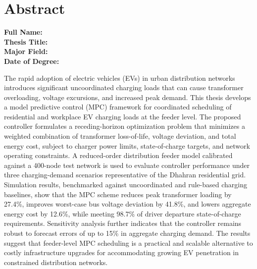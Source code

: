 \chapter*{Abstract}
\noindent
\textbf{Full Name:} \tauthor\\
\textbf{Thesis Title:} \ttitle\\
\textbf{Major Field:} \tmajor\\
\textbf{Date of Degree:} \tmonth\ \tyear

\vspace{0.5cm}
The rapid adoption of electric vehicles (EVs) in urban distribution networks introduces
significant uncoordinated charging loads that can cause transformer overloading, voltage
excursions, and increased peak demand. This thesis develops a model predictive control (MPC)
framework for coordinated scheduling of residential and workplace EV charging loads at the
feeder level. The proposed controller formulates a receding-horizon optimization problem that
minimizes a weighted combination of transformer loss-of-life, voltage deviation, and total
energy cost, subject to charger power limits, state-of-charge targets, and network operating
constraints. A reduced-order distribution feeder model calibrated against a 400-node test
network is used to evaluate controller performance under three charging-demand scenarios
representative of the Dhahran residential grid. Simulation results, benchmarked against
uncoordinated and rule-based charging baselines, show that the MPC scheme reduces peak
transformer loading by 27.4\%, improves worst-case bus voltage deviation by 41.8\%, and lowers
aggregate energy cost by 12.6\%, while meeting 98.7\% of driver departure state-of-charge
requirements. Sensitivity analysis further indicates that the controller remains robust to
forecast errors of up to 15\% in aggregate charging demand. The results suggest that
feeder-level MPC scheduling is a practical and scalable alternative to costly infrastructure
upgrades for accommodating growing EV penetration in constrained distribution networks.

\newpage
{}

